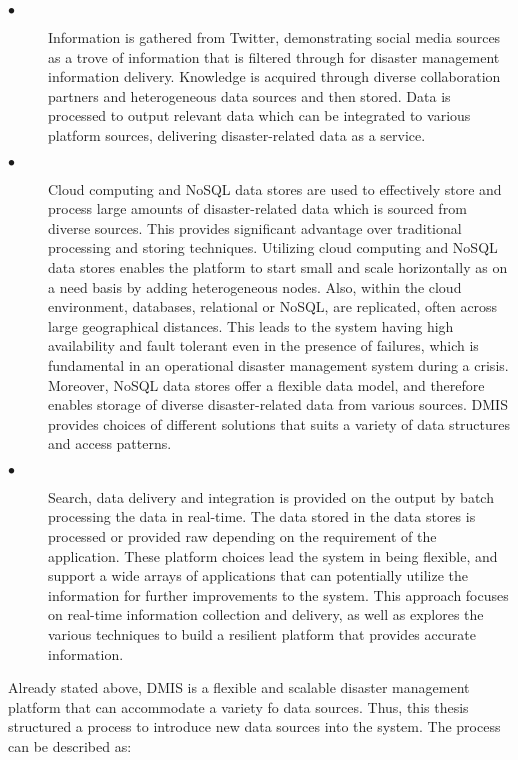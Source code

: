 \begin{description}
	\item[$\bullet$]
	Information is gathered from Twitter, demonstrating social media sources as a trove of information that is filtered through for disaster management information delivery. Knowledge is acquired through diverse collaboration partners and heterogeneous data sources and then stored. Data is processed to output relevant data which can be integrated to various platform sources, delivering disaster-related data as a service.
	
	\item[$\bullet$]
	Cloud computing and NoSQL data stores are used to effectively store and process large amounts of disaster-related data which is sourced from diverse sources. This provides significant advantage over traditional processing and storing techniques. Utilizing cloud computing and NoSQL data stores enables the platform to start small and scale horizontally as on a need basis by adding heterogeneous nodes. Also, within the cloud environment, databases, relational or NoSQL, are replicated, often across large geographical distances. This leads to the system having high availability and fault tolerant even in the presence of failures, which is fundamental in an operational disaster management system during a crisis. Moreover, NoSQL data stores offer a flexible data model, and therefore enables storage of diverse disaster-related data from various sources. DMIS provides choices of different solutions that suits a variety of data structures and access patterns.
	
	\item[$\bullet$]
	Search, data delivery and integration is provided on the output by batch processing the data in real-time. The data stored in the data stores is processed or provided raw depending on the requirement of the application. These platform choices lead the system in being flexible, and support a wide arrays of applications that can potentially utilize the information for further improvements to the system.	This approach focuses on real-time information collection and delivery, as well as explores the various techniques to build a resilient platform that provides accurate information. 
\end{description}

Already stated above, DMIS is a flexible and scalable disaster management platform that can accommodate a variety fo data sources. Thus, this thesis structured a process to introduce new data sources into the system. The process can be described as:

